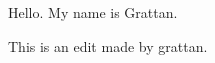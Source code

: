 \documentclass{grattanAlpha}
\begin{document}
Hello. My name is Grattan.

This is an edit made by grattan.
\end{document}
